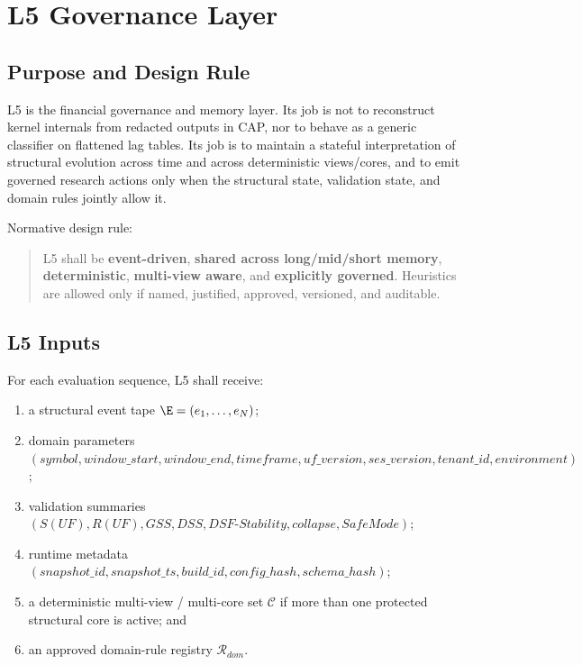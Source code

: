 \chapter{L5 Governance Layer}
\section{Purpose and Design Rule}

L5 is the financial governance and memory layer. Its job is not to reconstruct kernel internals from redacted outputs in CAP, nor to behave as a generic classifier on flattened lag tables. Its job is to maintain a stateful interpretation of structural evolution across time and across deterministic views/cores, and to emit governed research actions only when the structural state, validation state, and domain rules jointly allow it.

Normative design rule:
\begin{quote}
L5 shall be \textbf{event-driven}, \textbf{shared across long/mid/short memory}, \textbf{deterministic}, \textbf{multi-view aware}, and \textbf{explicitly governed}. Heuristics are allowed only if named, justified, approved, versioned, and auditable.
\end{quote}

\section{L5 Inputs}

For each evaluation sequence, L5 shall receive:
\begin{enumerate}[leftmargin=1.2cm]
    \item a structural event tape $\E=(e_1,\dots,e_N)$;
    \item domain parameters $(symbol, window\_start, window\_end, timeframe, uf\_version, ses\_version, tenant\_id, environment)$;
    \item validation summaries $(S(UF),R(UF),GSS,DSS,DSF\text{-}Stability,collapse,SafeMode)$;
    \item runtime metadata $(snapshot\_id, snapshot\_ts, build\_id, config\_hash, schema\_hash)$;
    \item a deterministic multi-view / multi-core set $\mathcal{C}$ if more than one protected structural core is active; and
    \item an approved domain-rule registry $\mathcal{R}_{dom}$.
\end{enumerate}

